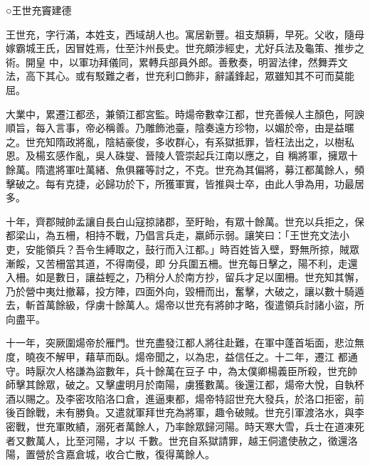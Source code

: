 
\begin{pinyinscope}

 ○王世充竇建德



 王世充，字行滿，本姓支，西域胡人也。寓居新豐。祖支頹耨，早死。父收，隨母嫁霸城王氏，因冒姓焉，仕至汴州長史。世充頗涉經史，尤好兵法及龜策、推步之術。開皇
 中，以軍功拜儀同，累轉兵部員外郎。善敷奏，明習法律，然舞弄文法，高下其心。或有駁難之者，世充利口飾非，辭議鋒起，眾雖知其不可而莫能屈。



 大業中，累遷江都丞，兼領江都宮監。時煬帝數幸江都，世充善候人主顏色，阿諛順旨，每入言事，帝必稱善。乃雕飾池臺，陰奏遠方珍物，以媚於帝，由是益暱之。世充知隋政將亂，陰結豪俊，多收群心，有系獄抵罪，皆枉法出之，以樹私恩。及楊玄感作亂，吳人硃燮、晉陵人管崇起兵江南以應之，自
 稱將軍，擁眾十餘萬。隋遣將軍吐萬緒、魚俱羅等討之，不克。世充為其偏將，募江都萬餘人，頻擊破之。每有克捷，必歸功於下，所獲軍實，皆推與士卒，由此人爭為用，功最居多。



 十年，齊郡賊帥孟讓自長白山寇掠諸郡，至盱眙，有眾十餘萬。世充以兵拒之，保都梁山，為五柵，相持不戰，乃倡言兵走，羸師示弱。讓笑曰：「王世充文法小吏，安能領兵？吾令生縛取之，鼓行而入江都。」時百姓皆入壁，野無所掠，賊眾漸餒，又苦柵當其道，不得南侵，即
 分兵圍五柵。世充每日擊之，陽不利，走還入柵。如是數日，讓益輕之，乃稍分人於南方抄，留兵才足以圍柵。世充知其懈，乃於營中夷灶撤幕，投方陣，四面外向，毀柵而出，奮擊，大破之，讓以數十騎遁去，斬首萬餘級，俘虜十餘萬人。煬帝以世充有將帥才略，復遣領兵討諸小盜，所向盡平。



 十一年，突厥圍煬帝於雁門。世充盡發江都人將往赴難，在軍中蓬首垢面，悲泣無度，曉夜不解甲，藉草而臥。煬帝聞之，以為忠，益信任之。十二年，遷江
 都通守。時厭次人格謙為盜數年，兵十餘萬在豆子中，為太僕卿楊義臣所殺，世充帥師擊其餘眾，破之。又擊盧明月於南陽，虜獲數萬。後還江都，煬帝大悅，自執杯酒以賜之。及李密攻陷洛口倉，進逼東都，煬帝特詔世充大發兵，於洛口拒密，前後百餘戰，未有勝負。又遣就軍拜世充為將軍，趣令破賊。世充引軍渡洛水，與李密戰，世充軍敗績，溺死者萬餘人，乃率餘眾歸河陽。時天寒大雪，兵士在道凍死者又數萬人，比至河陽，才以
 千數。世充自系獄請罪，越王侗遣使赦之，徵還洛陽，置營於含嘉倉城，收合亡散，復得萬餘人。




\end{pinyinscope}
